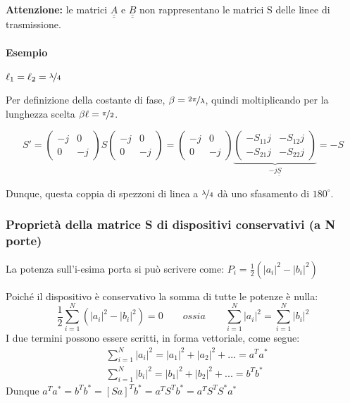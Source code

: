 \textbf{Attenzione:} le matrici $\underline{\underline{A}}$ e $\underline{\underline{B}}$ non rappresentano le matrici S delle linee di trasmissione.

\paragraph{Esempio} $\ell_1 = \ell_2 = \nicefrac{\lambda}{4}$

Per definizione della costante di fase, $\beta = \nicefrac{2\pi}{\lambda}$, quindi moltiplicando per la lunghezza scelta $\beta\ell = \nicefrac{\pi}{2}$. 

\[
S' = \left(
\begin{array}{cc}
-j &  0\\
0  & -j
\end{array}
\right)
S
\left(
\begin{array}{cc}
-j &  0\\
0  & -j
\end{array}
\right)
=
\left(
\begin{array}{cc}
-j &  0\\
0  & -j
\end{array}
\right)
\underbrace{\left(
	\begin{array}{cc}
	-S_{11}j &  -S_{12}j\\
	-S_{21}j  & -S_{22}j
	\end{array}
	\right)
}_{\text{$-j\underline{\underline{S}}$}}
=
-S
\]

Dunque, questa coppia di spezzoni di linea a $\nicefrac{\lambda}{4}$ dà uno sfasamento di $180^\circ$.

\subsubsection{Proprietà della matrice S di dispositivi conservativi (a N porte)}

La potenza sull'i-esima porta si può scrivere come:
$P_i = \frac{1}{2}\left(|a_i|^2-|b_i|^2\right)$

Poiché il dispositivo è conservativo la somma di tutte le potenze è nulla: \[\frac{1}{2}\sum_{i=1}^{N}\left(|a_i|^2-|b_i|^2\right) = 0
\qquad ossia \qquad
\sum_{i=1}^{N}|a_i|^2=\sum_{i=1}^{N}|b_i|^2
\]
I due termini possono essere scritti, in forma vettoriale, come segue:
\begin{align*}
&\sum_{i=1}^{N}|a_i|^2 = |a_1|^2+|a_2|^2+...=a^Ta^*
\\
&\sum_{i=1}^{N}|b_i|^2 = |b_1|^2+|b_2|^2+...=b^Tb^*
\end{align*}
Dunque $a^Ta^* = b^Tb^* = [Sa]^Tb^* = a^TS^Tb^* =
a^TS^TS^*a^*$

